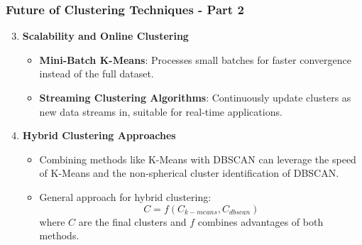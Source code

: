 \documentclass[aspectratio=169]{beamer}
\begin{document}
\begin{frame}[fragile]
    \frametitle{Future of Clustering Techniques - Part 2}
    \begin{enumerate}
        \setcounter{enumi}{2}
        \item \textbf{Scalability and Online Clustering}
            \begin{itemize}
                \item \textbf{Mini-Batch K-Means}: Processes small batches for faster convergence instead of the full dataset.
                \item \textbf{Streaming Clustering Algorithms}: Continuously update clusters as new data streams in, suitable for real-time applications.
            \end{itemize}
        \item \textbf{Hybrid Clustering Approaches}
            \begin{itemize}
                \item Combining methods like K-Means with DBSCAN can leverage the speed of K-Means and the non-spherical cluster identification of DBSCAN.
                \item General approach for hybrid clustering:
                \begin{equation}
                    C = f(C_{k-means}, C_{dbscan})
                \end{equation}
                where \(C\) are the final clusters and \(f\) combines advantages of both methods.
            \end{itemize}
    \end{enumerate}
\end{frame}
\end{document}
